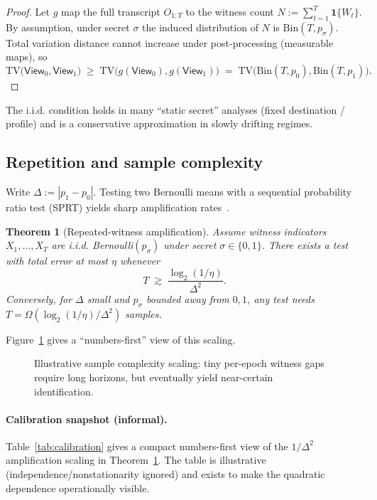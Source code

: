 \documentclass[11pt]{article}
\newtheorem{theorem}{Theorem}
\newcommand{\TV}{\mathrm{TV}}
\begin{document}
\begin{proof}
Let $g$ map the full transcript $O_{1:T}$ to the witness count $N:=\sum_{t=1}^T \mathbf{1}\{W_t\}$.
By assumption, under secret $\sigma$ the induced distribution of $N$ is $\mathrm{Bin}(T,p_\sigma)$.
Total variation distance cannot increase under post-processing (measurable maps), so
\[\TV\big(\mathsf{View}_0,\mathsf{View}_1\big)\;\ge\;\TV\big(g(\mathsf{View}_0),g(\mathsf{View}_1)\big)\;=\;\TV\big(\mathrm{Bin}(T,p_0),\mathrm{Bin}(T,p_1)\big).\]
\end{proof}

The i.i.d. condition holds in many ``static secret'' analyses (fixed destination / profile) and is a conservative approximation in slowly drifting regimes.

\subsection{Repetition and sample complexity}
\label{sec:amplification}
Write $\Delta := |p_1-p_0|$.
Testing two Bernoulli means with a sequential probability ratio test (SPRT) yields sharp amplification rates~\cite{wald_sprt_1945,howard2021confseq}.

\begin{theorem}[Repeated-witness amplification]
\label{thm:repeat-witness}
Assume witness indicators $X_1,\dots,X_T$ are i.i.d. Bernoulli$(p_\sigma)$ under secret $\sigma\in\{0,1\}$.
There exists a test with total error at most $\eta$ whenever
\[
T \;\gtrsim\; \frac{\log_2(1/\eta)}{\Delta^2}.
\]
Conversely, for $\Delta$ small and $p_\sigma$ bounded away from $0,1$, any test needs $T=\Omega(\log_2(1/\eta)/\Delta^2)$ samples.
\end{theorem}

Figure~\ref{fig:eps-to-samples} gives a ``numbers-first'' view of this scaling.

\begin{figure}[t]
  \centering
  \caption{Illustrative sample complexity scaling: tiny per-epoch witness gaps require long horizons, but eventually yield near-certain identification.
  }
  \label{fig:eps-to-samples}
\end{figure}

\paragraph{Calibration snapshot (informal).}
Table~\ref{tab:calibration} gives a compact numbers-first view of the $1/\Delta^2$ amplification scaling in Theorem~\ref{thm:repeat-witness}.
The table is illustrative (independence/nonstationarity ignored) and exists to make the quadratic dependence operationally visible.
\end{document}
